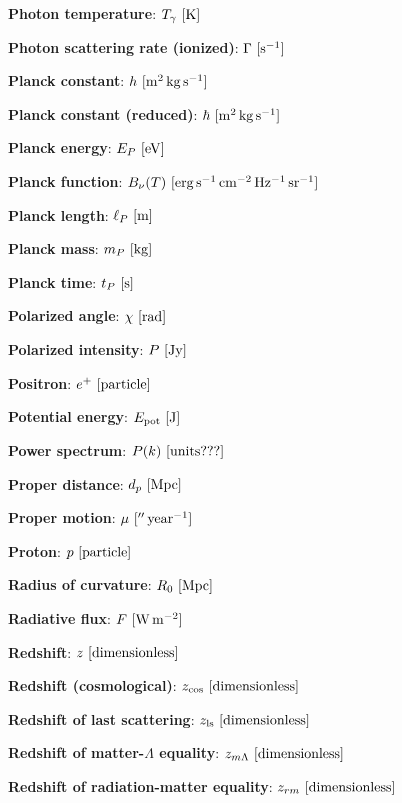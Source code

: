 \documentclass[a4paper,11pt]{article}
\begin{document}
{\noindent}\textbf{Photon temperature}: $T_\gamma ~ [{\rm K}]$

{\noindent}\textbf{Photon scattering rate (ionized)}: $\Gamma ~ [{\rm s^{-1}}]$

{\noindent}\textbf{Planck constant}: $h ~ [{\rm m^2\,kg\,s^{-1}}]$

{\noindent}\textbf{Planck constant (reduced)}: $\hbar ~ [{\rm m^2\,kg\,s^{-1}}]$

{\noindent}\textbf{Planck energy}: $E_P ~ [{\rm eV}]$

{\noindent}\textbf{Planck function}: $B_\nu(T) ~ [{\rm erg\,s^{-1}\,cm^{-2}\,Hz^{-1}\,sr^{-1}}]$

{\noindent}\textbf{Planck length}: $\ell_P ~ [{\rm m}]$

{\noindent}\textbf{Planck mass}: $m_P ~ [{\rm kg}]$

{\noindent}\textbf{Planck time}: $t_P ~ [{\rm s}]$

{\noindent}\textbf{Polarized angle}: $\chi ~ [{\rm rad}]$

{\noindent}\textbf{Polarized intensity}: $P ~ [{\rm Jy}]$

{\noindent}\textbf{Positron}: $e^+ ~ [{\rm particle}]$

{\noindent}\textbf{Potential energy}: $E_\mathrm{pot} ~ [{\rm J}]$

{\noindent}\textbf{Power spectrum}: $P(k) ~ [{\rm units???}]$

{\noindent}\textbf{Proper distance}: $d_p ~ [{\rm Mpc}]$

{\noindent}\textbf{Proper motion}: $\mu ~ [{\rm ''\,year^{-1}}]$

{\noindent}\textbf{Proton}: $p ~ [{\rm particle}]$

{\noindent}\textbf{Radius of curvature}: $R_0 ~ [{\rm Mpc}]$

{\noindent}\textbf{Radiative flux}: $F ~ [{\rm W\,m^{-2}}]$

{\noindent}\textbf{Redshift}: $z ~ [{\rm dimensionless}]$

{\noindent}\textbf{Redshift (cosmological)}: $z_\mathrm{cos} ~ [{\rm dimensionless}]$

{\noindent}\textbf{Redshift of last scattering}: $z_\mathrm{ls} ~ [{\rm dimensionless}]$

{\noindent}\textbf{Redshift of matter-$\Lambda$ equality}: $z_{m\Lambda} ~ [{\rm dimensionless}]$

{\noindent}\textbf{Redshift of radiation-matter equality}: $z_{rm} ~ [{\rm dimensionless}]$
\end{document}
